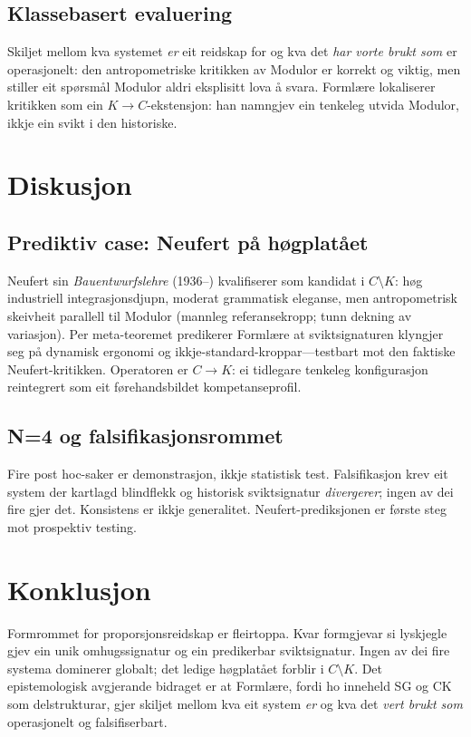 \documentclass[10pt,twocolumn]{article}
\begin{document}
\subsection{Klassebasert evaluering}
Skiljet mellom kva systemet \emph{er} eit reidskap for og kva det \emph{har vorte brukt som} er operasjonelt: den antropometriske kritikken av Modulor \citep{LorenzoPalomera2022} er korrekt og viktig, men stiller eit sp\o{}rsm\aa l Modulor aldri eksplisitt lova \aa{} svara. Forml\ae re lokaliserer kritikken som ein $K\rightarrow C$-ekstensjon: han namngjev ein tenkeleg utvida Modulor, ikkje ein svikt i den historiske.

\section{Diskusjon}

\subsection{Prediktiv case: Neufert p\aa{} h\o{}gplat\aa et}
Neufert sin \emph{Bauentwurfslehre} (1936--) kvalifiserer som kandidat i $C \setminus K$: h\o{}g industriell integrasjonsdjupn, moderat grammatisk eleganse, men antropometrisk skeivheit parallell til Modulor (mannleg referansekropp; tunn dekning av variasjon). Per meta-teoremet \citep[prop.~7.15]{Finne2026} predikerer Forml\ae re at sviktsignaturen klyngjer seg p\aa{} dynamisk ergonomi og ikkje-standard-kroppar---testbart mot den faktiske Neufert-kritikken. Operatoren er $C \rightarrow K$: ei tidlegare tenkeleg konfigurasjon reintegrert som eit f\o{}rehandsbildet kompetanseprofil.

\subsection{N=4 og falsifikasjonsrommet}
Fire post hoc-saker er demonstrasjon, ikkje statistisk test. Falsifikasjon krev eit system der kartlagd blindflekk og historisk sviktsignatur \emph{divergerer}; ingen av dei fire gjer det. Konsistens er ikkje generalitet. Neufert-prediksjonen er f\o{}rste steg mot prospektiv testing.


\section{Konklusjon}

Formrommet for proporsjonsreidskap er fleirtoppa. Kvar formgjevar si lyskjegle gjev ein unik omhugssignatur og ein predikerbar sviktsignatur. Ingen av dei fire systema dominerer globalt; det ledige h\o{}gplat\aa et forblir i $C \setminus K$. Det epistemologisk avgjerande bidraget er at Forml\ae re, fordi ho inneheld SG og CK som delstrukturar, gjer skiljet mellom kva eit system \emph{er} og kva det \emph{vert brukt som} operasjonelt og falsifiserbart.
\end{document}
